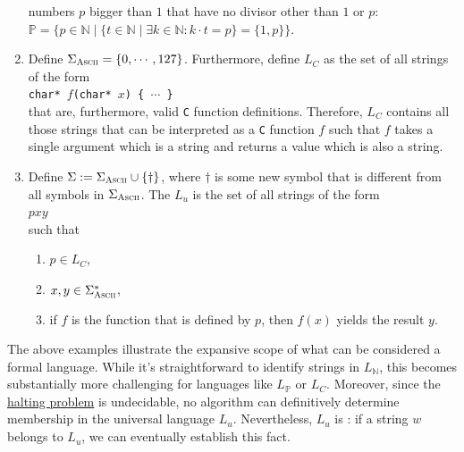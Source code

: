 \begin{enumerate}
      numbers $p$ bigger than $1$ that have no divisor other than $1$ or $p$:
      \\[0.2cm]
      \hspace*{1.3cm}
      $\mathbb{P} = \bigl\{ p \in \mathbb{N} \;\big|\; \{ t \in \mathbb{N} \mid \exists k \in
      \mathbb{N} : k \cdot t = p \} = \{1, p\} \bigr\}$.
\item Define $\Sigma_{\textsc{\scriptsize Ascii}} = \{ 0, \cdots, 127\}$.  Furthermore, define $L_C$
      as the set of all strings of the form
      \\[0.2cm]
      \hspace*{1.3cm}
      \texttt{char* $f$(char* $x$) \{ $\cdots$ \}}
      \\[0.2cm]
      that are, furthermore, valid \texttt{C} function definitions.
      Therefore,  $L_C$ contains all those strings that can be interpreted as a \texttt{C} function $f$
      such that $f$ takes a single argument which is a string and returns a value which is also a
      string.
\item Define $\Sigma := \Sigma_{\textsc{\scriptsize Ascii}} \cup \{\dag\}$, where
      $\mathtt{\dag}$ is some new symbol that is different from all symbols in
      $\Sigma_{\textsc{\scriptsize Ascii}}$.
      The   $L_u$ is the set of all strings of the form
      \\[0.2cm]
      \hspace*{1.3cm}
      $p$\dag$x$\dag$y$
      \\[0.2cm]
      such that
      \begin{enumerate}
      \item $p \in L_C$,
      \item $x,y \in \Sigma_{\textsc{Ascii}}^*$,
      \item if $f$ is the function that is defined by $p$, then $f(x)$ yields the result $y$.
            \eox
      \end{enumerate}
    \end{enumerate}

The above examples illustrate the expansive scope of what can be considered a formal language. While it's
straightforward to identify strings in \( L_\mathbb{N} \), this becomes substantially more challenging for
languages like \( L_\mathbb{P} \) or \( L_C \). Moreover, since the
\href{https://en.wikipedia.org/wiki/Halting_problem}{halting problem} is undecidable, no algorithm can
definitively determine membership in the universal language \( L_u \). Nevertheless, \( L_u \) is : if a string
\( w \) belongs to \( L_u \), we can eventually establish this fact.  

